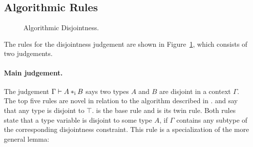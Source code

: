 \subsection{Algorithmic Rules}

\begin{figure}[!t]


  \caption{Algorithmic Disjointness.}
  \label{fig:disjointness}
\end{figure}


The rules for the disjointness judgement are shown in
Figure~\ref{fig:disjointness}, which consists of two judgements.
 
\paragraph{Main judgement.} The judgement $\Gamma \vdash A *_\textnormal{i} B$ says
two types $A$ and $B$ are disjoint in a context $\Gamma$.
The top five rules are novel in relation to the algorithm described in \oldname.
 and  say that any type is disjoint to 
$\top$.
 is the base rule and  is its twin rule. 
Both rules state that a type variable is disjoint to some type $A$, if $\Gamma$ contains any
subtype of the corresponding disjointness constraint. 
This rule is a specialization of the more general lemma:

